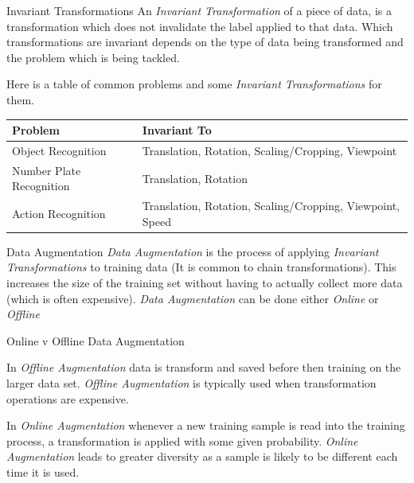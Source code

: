 \documentclass[11pt,a4paper]{article}
\begin{document}
  \begin{definition}{Invariant Transformations}
    An \textit{Invariant Transformation} of a piece of data, is a transformation which does not invalidate the label applied to that data. Which transformations are invariant depends on the type of data being transformed and the problem which is being tackled.
    \par Here is a table of common problems and some \textit{Invariant Transformations} for them.
    \begin{center}
      \begin{tabular}{|l|l|}
        \hline
        \textbf{Problem}&\textbf{Invariant To}\\
        \hline
        Object Recognition& Translation, Rotation, Scaling/Cropping, Viewpoint\\
        Number Plate Recognition & Translation, Rotation\\
        Action Recognition & Translation, Rotation, Scaling/Cropping, Viewpoint, Speed\\
        \hline
      \end{tabular}
    \end{center}
  \end{definition}

  \begin{definition}{Data Augmentation}
    \textit{Data Augmentation} is the process of applying \textit{Invariant Transformations} to training data (It is common to chain transformations). This increases the size of the training set without having to actually collect more data (which is often expensive). \textit{Data Augmentation} can be done either \textit{Online} or \textit{Offline}
  \end{definition}

  \begin{proposition}{Online v Offline Data Augmentation}
    \par In \textit{Offline Augmentation} data is transform and saved before then training on the larger data set. \textit{Offline Augmentation} is typically used when transformation operations are expensive.
    \par In \textit{Online Augmentation} whenever a new training sample is read into the training process, a transformation is applied with some given probability. \textit{Online Augmentation} leads to greater diversity as a sample is likely to be different each time it is used.
  \end{proposition}
\end{document}
